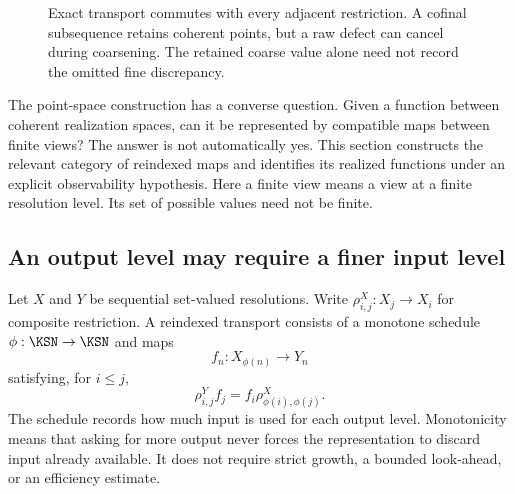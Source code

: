 \begin{figure}[htbp]\centering{}\caption{Exact transport commutes with every adjacent restriction. A cofinal subsequence retains coherent points, but a raw defect can cancel during coarsening. The retained coarse value alone need not record the omitted fine discrepancy.}\label{KS:fig:tower}\end{figure}


\label{KS:sec:observation}
The point-space construction has a converse question. Given a function between coherent realization spaces, can it be represented by compatible maps between finite views? The answer is not automatically yes. This section constructs the relevant category of reindexed maps and identifies its realized functions under an explicit observability hypothesis. Here a finite view means a view at a finite resolution level. Its set of possible values need not be finite.

\subsection{An output level may require a finer input level}
Let \(X\) and \(Y\) be sequential set-valued resolutions. Write \(\rho^X_{i,j}:X_j\to X_i\) for composite restriction. A reindexed transport consists of a monotone schedule \(\phi:\KSN\to\KSN\) and maps
\[
 f_n:X_{\phi(n)}\longrightarrow Y_n
\]
satisfying, for \(i\le j\),
\begin{equation}\label{KS:eq:scheduled-naturality}
 \rho^Y_{i,j}f_j=f_i\rho^X_{\phi(i),\phi(j)}.
\end{equation}
The schedule records how much input is used for each output level. Monotonicity means that asking for more output never forces the representation to discard input already available. It does not require strict growth, a bounded look-ahead, or an efficiency estimate.

